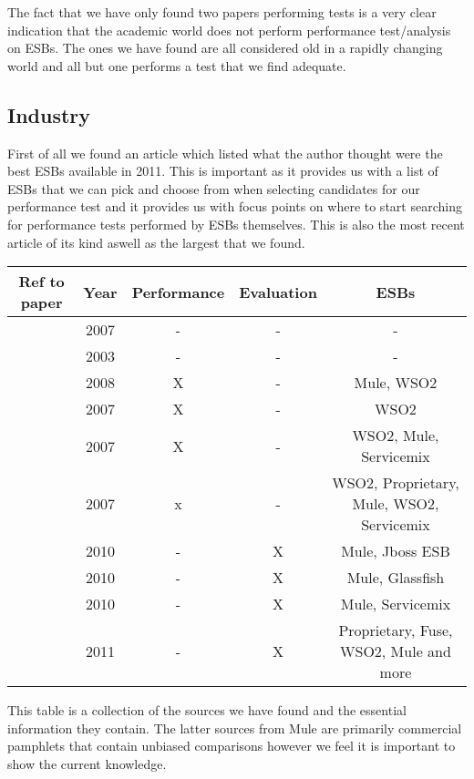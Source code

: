 
The fact that we have only found two papers performing tests is a very clear indication that the academic world does not perform performance test/analysis on ESBs. The ones we have found are all considered old in a rapidly changing world and all but one performs a test that we find adequate.


\subsection{Industry}
First of all we found an article\cite{mehta11} which listed what the author thought were the best ESBs available in 2011. This is important as it provides us with a list of ESBs that we can pick and choose from when selecting candidates for our performance test and it provides us with focus points on where to start searching for performance tests performed by ESBs themselves. This is also the most recent article of its kind aswell as the largest that we found.

\begin{tabular}{| c | c | c | c | c |}
	\hline
	Ref to paper & Year & Performance & Evaluation & ESBs \\ 
	\hline	
	\cite{falko07} & 2007 & - & - & - \\ 
	\hline	
	\cite{fenner03} & 2003 & - & - & - \\
	\hline	
	\cite{mulesoft08} & 2008 & X & - & Mule, WSO2\\
	\hline	
	\cite{Perera07} & 2007 & X & - & WSO2 \\
	\hline	
	\cite{Perera07R2} & 2007 & X & - & WSO2, Mule, Servicemix\\
	\hline	
	\cite{Perera07R3} & 2007 & x & - & WSO2, Proprietary, Mule, WSO2, Servicemix \\
	\hline	
	\cite{mulevsjboss} & 2010 & - & X & Mule, Jboss ESB\\
	\hline	
	\cite{mulevsglassfish} & 2010 & - & X & Mule, Glassfish \\
	\hline	
	\cite{mulevsservicemix} & 2010 & - & X & Mule, Servicemix \\
	\hline
	\cite{forrester11} & 2011 & - & X & Proprietary, Fuse, WSO2, Mule and more\\
	\hline
\end{tabular}
This table is a collection of the sources we have found and the essential information they contain. The latter sources from Mule are primarily commercial pamphlets that contain unbiased comparisons however we feel it is important to show the current knowledge.




